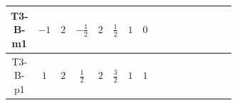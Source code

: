 \documentclass[8pt]{article}
\begin{document}
\begin{landscape}
\begin{longtable}{@{}cccccccc >{\raggedright\arraybackslash}p{0.21\linewidth} >{\raggedright\arraybackslash}p{0.21\linewidth} >{\raggedright\arraybackslash}p{0.21\linewidth}@{}}
T3-B-m1 & $-1$ & $2$ & $-\frac{1}{2}$ & $2$ & $\frac{1}{2}$ & $1$ & $0$ & \scriptsize\adjustbox{max width=\linewidth}{$\begin{gathered} -S_{1,j_1} S_{1,j_1}{}^{\dagger } m_1^2 \\ +\frac{1}{2} S_{1,j_3} S_{1,j_4} S_{1,j_1}{}^{\dagger } S_{1,j_2}{}^{\dagger } \mathcal{I}_{S_1,j_1,j_3,j_2,j_4}{}^1 \lambda_{S_1}^{(1)}^{(1)}\end{gathered}$} & \scriptsize\adjustbox{max width=\linewidth}{$\begin{gathered} +D_{\mu _1}\left(S_{1,j_1}\right){}^{\dagger } D_{\mu _1}\left(S_{1,j_1}\right)\end{gathered}$} & \scriptsize\adjustbox{max width=\linewidth}{$\begin{gathered} -m_2^2 S_{2,j_1} S_{2,j_1}{}^{\dagger } \\ +\frac{1}{2} S_{2,j_3} S_{2,j_4} S_{2,j_1}{}^{\dagger } S_{2,j_2}{}^{\dagger } \mathcal{I}_{S_2,j_1,j_3,j_2,j_4}{}^1 \lambda_{S_2}^{(1)}^{(1)}\end{gathered}$} \\
\midrule
T3-B-p1 & $1$ & $2$ & $\frac{1}{2}$ & $2$ & $\frac{3}{2}$ & $1$ & $1$ & \scriptsize\adjustbox{max width=\linewidth}{$\begin{gathered} -S_{1,j_1} S_{1,j_1}{}^{\dagger } m_1^2 \\ +\frac{1}{2} S_{1,j_3} S_{1,j_4} S_{1,j_1}{}^{\dagger } S_{1,j_2}{}^{\dagger } \mathcal{I}_{S_1,j_1,j_3,j_2,j_4}{}^1 \lambda_{S_1}^{(1)}^{(1)}\end{gathered}$} & \scriptsize\adjustbox{max width=\linewidth}{$\begin{gathered} +D_{\mu _1}\left(S_{1,j_1}\right){}^{\dagger } D_{\mu _1}\left(S_{1,j_1}\right)\end{gathered}$} & \scriptsize\adjustbox{max width=\linewidth}{$\begin{gathered} -m_2^2 S_{2,j_1} S_{2,j_1}{}^{\dagger } \\ +\frac{1}{2} S_{2,j_3} S_{2,j_4} S_{2,j_1}{}^{\dagger } S_{2,j_2}{}^{\dagger } \mathcal{I}_{S_2,j_1,j_3,j_2,j_4}{}^1 \lambda_{S_2}^{(1)}^{(1)}\end{gathered}$} \\
\midrule

\end{longtable}
\end{landscape}
\end{document}
